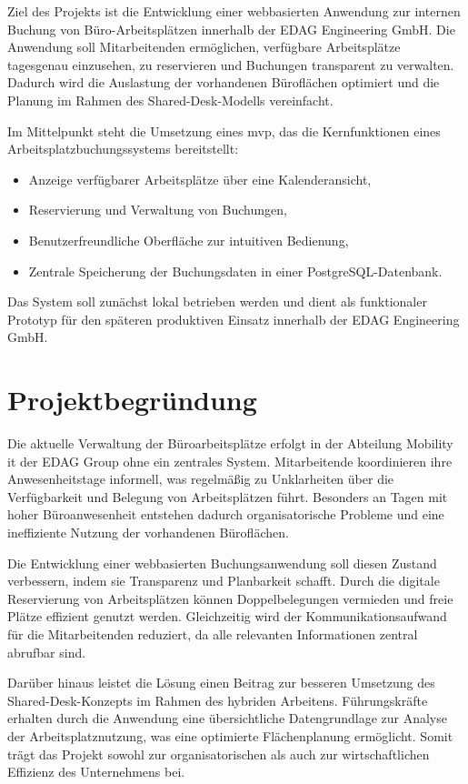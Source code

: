 \documentclass[11pt,a4paper]{report}
\begin{document}
Ziel des Projekts ist die Entwicklung einer webbasierten Anwendung zur internen Buchung von Büro-Arbeitsplätzen innerhalb der EDAG Engineering GmbH.
Die Anwendung soll Mitarbeitenden ermöglichen, verfügbare Arbeitsplätze tagesgenau einzusehen, zu reservieren und Buchungen transparent zu verwalten. Dadurch wird die Auslastung der vorhandenen Büroflächen optimiert und die Planung im Rahmen des Shared-Desk-Modells vereinfacht.

Im Mittelpunkt steht die Umsetzung eines \gls{mvp}, das die Kernfunktionen eines Arbeitsplatzbuchungssystems bereitstellt:

\begin{itemize}
  \item Anzeige verfügbarer Arbeitsplätze über eine Kalenderansicht,
  \item Reservierung und Verwaltung von Buchungen,
  \item Benutzerfreundliche Oberfläche zur intuitiven Bedienung,
  \item Zentrale Speicherung der Buchungsdaten in einer PostgreSQL-Datenbank.
\end{itemize}

Das System soll zunächst lokal betrieben werden und dient als funktionaler Prototyp für den späteren produktiven Einsatz innerhalb der EDAG Engineering GmbH.


\section{Projektbegründung}


Die aktuelle Verwaltung der Büroarbeitsplätze erfolgt in der Abteilung Mobility \gls{it} der EDAG Group ohne ein zentrales System. Mitarbeitende koordinieren ihre Anwesenheitstage informell, was regelmäßig zu Unklarheiten über die Verfügbarkeit und Belegung von Arbeitsplätzen führt. Besonders an Tagen mit hoher Büroanwesenheit entstehen dadurch organisatorische Probleme und eine ineffiziente Nutzung der vorhandenen Büroflächen.

Die Entwicklung einer webbasierten Buchungsanwendung soll diesen Zustand verbessern, indem sie Transparenz und Planbarkeit schafft. Durch die digitale Reservierung von Arbeitsplätzen können Doppelbelegungen vermieden und freie Plätze effizient genutzt werden. Gleichzeitig wird der Kommunikationsaufwand für die Mitarbeitenden reduziert, da alle relevanten Informationen zentral abrufbar sind.

Darüber hinaus leistet die Lösung einen Beitrag zur besseren Umsetzung des Shared-Desk-Konzepts im Rahmen des hybriden Arbeitens. Führungskräfte erhalten durch die Anwendung eine übersichtliche Datengrundlage zur Analyse der Arbeitsplatznutzung, was eine optimierte Flächenplanung ermöglicht. Somit trägt das Projekt sowohl zur organisatorischen als auch zur wirtschaftlichen Effizienz des Unternehmens bei.
\end{document}
